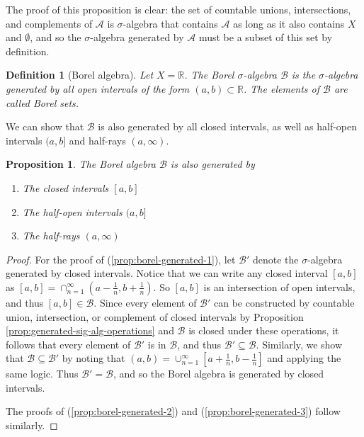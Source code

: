 \documentclass{amsart}
\newcommand{\bbR}{\mathbb{R}}
\newcommand{\Borel}{\mathcal{B}}
\newtheorem{proposition}[theorem]{Proposition}
\newtheorem{definition}[theorem]{Definition}
\begin{document}
The proof of this proposition is clear: the set of countable unions,
intersections, and complements of $\mathcal{A}$ is $\sigma$-algebra that
contains $\mathcal{A}$ as long as
it also contains $X$ and $\emptyset$, and so the $\sigma$-algebra generated by
$\mathcal{A}$ must be a subset of this set by definition.

\begin{definition}[Borel algebra]\label{def:borel}
    Let $X = \bbR$. The Borel $\sigma$-algebra $\Borel$ is the $\sigma$-algebra
    generated by all open intervals of the form $(a,b) \subset \bbR$. The
    elements of $\Borel$ are called Borel sets.
\end{definition}

We can show that $\Borel$ is also generated by all closed intervals, as well as
half-open intervals $(a, b]$ and half-rays $(a, \infty)$.

\begin{proposition}\label{prop:borel-generated}
   The Borel algebra $\Borel$ is also generated by
   \begin{enumerate}
       \item The closed intervals $[a,b]$ \label{prop:borel-generated-1}
       \item The half-open intervals $(a,b]$ \label{prop:borel-generated-2}
       \item The half-rays $(a, \infty)$ \label{prop:borel-generated-3}
   \end{enumerate} 
\end{proposition}
\begin{proof}
    For the proof of (\ref{prop:borel-generated-1}), let $\Borel'$ denote the
    $\sigma$-algebra generated by closed intervals. Notice that we can write any
    closed interval $[a,b]$ as $[a,b] =
    \cap_{n=1}^\infty(a - \frac{1}{n}, b + \frac{1}{n})$. So $[a,b]$ is an
    intersection of open intervals, and thus $[a,b] \in \Borel$. Since every
    element of $\Borel'$ can be constructed by countable union, intersection, or
    complement of closed intervals by Proposition
    \ref{prop:generated-sig-alg-operations} and $\Borel$ is closed under these
    operations, it follows that every element of $\Borel'$ is in $\Borel$, and
    thus $\Borel' \subseteq \Borel$. Similarly, we show that $\Borel \subseteq
    \Borel'$ by noting that $(a,b) = \cup_{n=1}^\infty [a+\frac{1}{n}, b -
    \frac{1}{n}]$ and applying the same logic. Thus $\Borel' = \Borel$,
    and so the Borel algebra is generated by closed intervals. 

    \bigskip

    The proofs of (\ref{prop:borel-generated-2}) and
    (\ref{prop:borel-generated-3}) follow similarly. 
\end{proof}
\end{document}
